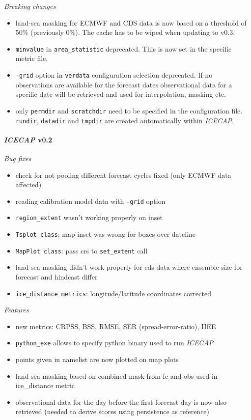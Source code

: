 \documentclass[DIV=10, parskip=full]{scrreprt}
\newcommand{\ice}{\textit{ICECAP}\xspace}
\begin{document}
\textit{Breaking changes}
\begin{itemize}
	\item land-sea masking for ECMWF and CDS data is now based on a threshold of 50\% (previously 0\%). The cache has to be wiped when updating to v0.3.
	\item \texttt{minvalue} in \texttt{area\_statistic} deprecated. This is now set in the specific metric file. 
	\item \texttt{-grid} option in \texttt{verdata} configuration selection deprecated. If no observations are available for the forecast dates observational data for a specific date will be retrieved and used for interpolation, masking etc. 
	\item only \texttt{permdir} and \texttt{scratchdir} need to be specified in the configuration file. \texttt{rundir}, \texttt{datadir} and \texttt{tmpdir} are created automatically within \ice.
\end{itemize}


\paragraph{\textbf{\ice v0.2\\[5pt]}}

\textit{Bug fixes}
\begin{itemize}
	\item check for not pooling different forecast cycles fixed (only ECMWF data affected)
	\item  reading calibration model data with \texttt{-grid} option
	\item \texttt{region\_extent} wasn't working properly on inset
	\item \texttt{Tsplot class}: map inset was wrong for boxes over dateline 
	\item \texttt{MapPlot class}: pass crs to \texttt{set\_extent} call
	\item land-sea-masking didn't work properly for cds data where ensemble size for forecast and hindcast  differ
	\item \texttt{ice\_distance metrics}: longitude/latitude coordinates corrected
	
\end{itemize}

\textit{Features}
\begin{itemize}
	\item new metrics: CRPSS, BSS, RMSE, SER (spread-error-ratio), IIEE
	\item \texttt{python\_exe} allows to specify python binary used to run \ice
	\item points given in namelist are now plotted on map plots
	\item land-sea masking based on combined mask from fc and obs used in ice\_distance metric
	\item observational data for the day before the first forecast day is now also retrieved (needed to derive scores using persistence as reference)
\end{itemize}
\end{document}
